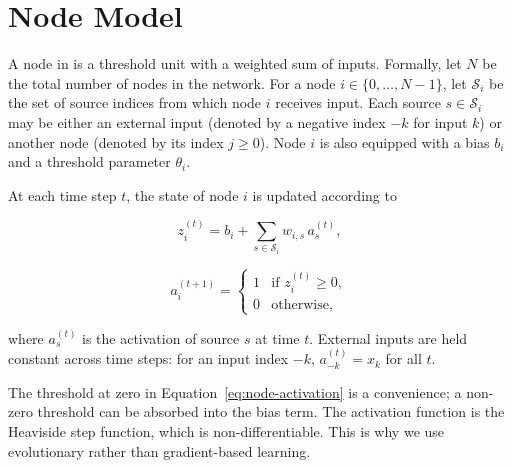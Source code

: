 \section{Node Model}
\label{sec:node-model}

A node in \modnet{} is a threshold unit with a weighted sum of inputs.
Formally, let $N$ be the total number of nodes in the network. For a
node $i \in \{0, \ldots, N-1\}$, let $\mathcal{S}_i$ be the set of
source indices from which node $i$ receives input. Each source
$s \in \mathcal{S}_i$ may be either an external input (denoted by a
negative index $-k$ for input $k$) or another node (denoted by its
index $j \geq 0$). Node $i$ is also equipped with a bias $b_i$ and a
threshold parameter $\theta_i$.

At each time step $t$, the state of node $i$ is updated according to

\begin{equation}
  z_i^{(t)} = b_i + \sum_{s \in \mathcal{S}_i} w_{i,s} \, a_s^{(t)},
  \label{eq:node-pre-activation}
\end{equation}

\begin{equation}
  a_i^{(t+1)} =
  \begin{cases}
    1 & \text{if } z_i^{(t)} \geq 0, \\
    0 & \text{otherwise},
  \end{cases}
  \label{eq:node-activation}
\end{equation}

where $a_s^{(t)}$ is the activation of source $s$ at time $t$. External
inputs are held constant across time steps: for an input index $-k$,
$a_{-k}^{(t)} = x_k$ for all $t$.

The threshold at zero in Equation~\ref{eq:node-activation} is a
convenience; a non-zero threshold can be absorbed into the bias term.
The activation function is the Heaviside step function, which is
non-differentiable. This is why we use evolutionary rather than
gradient-based learning.

